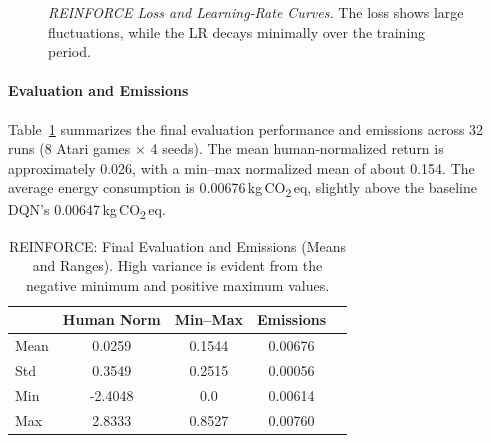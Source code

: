 \begin{figure}
	\centering
	\quad
	\caption{\textit{REINFORCE Loss and Learning‐Rate Curves.} 
		The loss shows large fluctuations, while the LR decays minimally over the training period.}
	\label{fig:reinforce_trainmetrics2}
\end{figure}

\paragraph{Evaluation and Emissions}
Table~\ref{tab:reinforce_evalstats} summarizes the final evaluation performance and emissions across 32 runs (8 Atari games $\times$ 4 seeds). The mean human‐normalized return is approximately \num{0.026}, with a min–max normalized mean of about 0.154. The average energy consumption is \num{0.00676}\,kg\,CO\textsubscript{2}\,eq, slightly above the baseline DQN's \num{0.00647}\,kg\,CO\textsubscript{2}\,eq.

\begin{table}
	\caption{REINFORCE: Final Evaluation and Emissions (Means and Ranges). 
		High variance is evident from the negative minimum and positive maximum values.}
	\label{tab:reinforce_evalstats}
	\centering
	\begin{tabular}{lcccc}
		\toprule
		& \textbf{Human Norm} & \textbf{Min--Max} & \textbf{Emissions} \\
		\midrule
		Mean & 0.0259 & 0.1544 & 0.00676 \\
		Std  & 0.3549 & 0.2515 & 0.00056 \\
		Min  & -2.4048 & 0.0    & 0.00614 \\
		Max  & 2.8333 & 0.8527 & 0.00760 \\
		\bottomrule
	\end{tabular}
\end{table}


